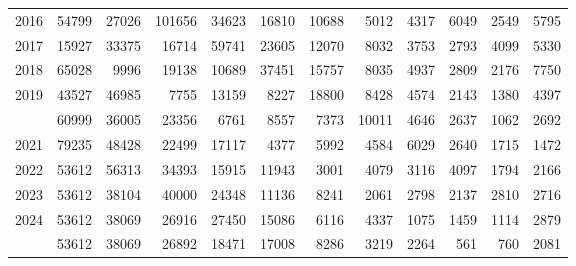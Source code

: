 \documentclass[
]{article}
\begin{document}
\begin{longtable}[t]{lrrrrrrrrrrr}
2016 & 54799 & 27026 & 101656 & 34623 & 16810 & 10688 & 5012 & 4317 & 6049 & 2549 & 5795\\
2017 & 15927 & 33375 & 16714 & 59741 & 23605 & 12070 & 8032 & 3753 & 2793 & 4099 & 5330\\
2018 & 65028 & 9996 & 19138 & 10689 & 37451 & 15757 & 8035 & 4937 & 2809 & 2176 & 7750\\
2019 & 43527 & 46985 & 7755 & 13159 & 8227 & 18800 & 8428 & 4574 & 2143 & 1380 & 4397\\
\addlinespace
2020 & 60999 & 36005 & 23356 & 6761 & 8557 & 7373 & 10011 & 4646 & 2637 & 1062 & 2692\\
2021 & 79235 & 48428 & 22499 & 17117 & 4377 & 5992 & 4584 & 6029 & 2640 & 1715 & 1472\\
2022 & 53612 & 56313 & 34393 & 15915 & 11943 & 3001 & 4079 & 3116 & 4097 & 1794 & 2166\\
2023 & 53612 & 38104 & 40000 & 24348 & 11136 & 8241 & 2061 & 2798 & 2137 & 2810 & 2716\\
2024 & 53612 & 38069 & 26916 & 27450 & 15086 & 6116 & 4337 & 1075 & 1459 & 1114 & 2879\\
\addlinespace
2025 & 53612 & 38069 & 26892 & 18471 & 17008 & 8286 & 3219 & 2264 & 561 & 760 & 2081\\*
\end{longtable}
\end{document}
